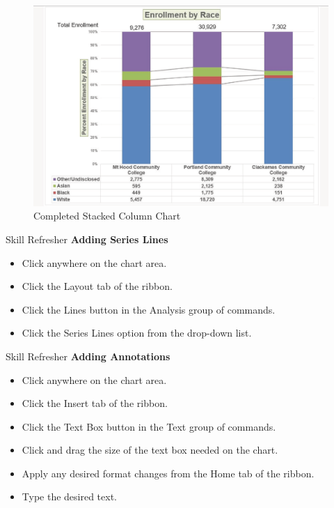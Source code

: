 \begin{figure}[H]
	\centering
	\includegraphics[width=\maxwidth{.95\linewidth}]{gfx/ch04_fig42}
	\caption{Completed Stacked Column Chart}
	\label{04:fig42}
\end{figure}


\begin{center}
	\begin{sklbox}{Skill Refresher}
		\textbf{Adding Series Lines}
		\\
		\begin{itemize}
			\setlength{\itemsep}{0pt}
			\setlength{\parskip}{0pt}
			\setlength{\parsep}{0pt}
			
			\item Click anywhere on the chart area.
			\item Click the Layout tab of the ribbon.
			\item Click the Lines button in the Analysis group of commands.
			\item Click the Series Lines option from the drop-down list.
			
		\end{itemize}
	\end{sklbox}
\end{center}

\begin{center}
	\begin{sklbox}{Skill Refresher}
		\textbf{Adding Annotations}
		\\
		\begin{itemize}
			\setlength{\itemsep}{0pt}
			\setlength{\parskip}{0pt}
			\setlength{\parsep}{0pt}
			
			\item Click anywhere on the chart area.
			\item Click the Insert tab of the ribbon.
			\item Click the Text Box button in the Text group of commands.
			\item Click and drag the size of the text box needed on the chart.
			\item Apply any desired format changes from the Home tab of the ribbon.
			\item Type the desired text.
			
		\end{itemize}
	\end{sklbox}
\end{center}

